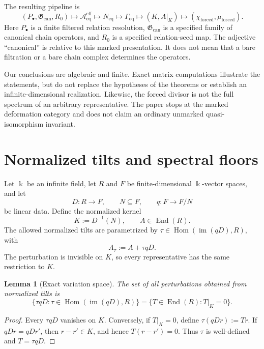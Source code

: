 \documentclass[11pt]{article}
\newtheorem{lemma}[theorem]{Lemma}
\theoremstyle{definition}
\newcommand{\kk}{\Bbbk}
\newcommand{\im}{\operatorname{im}}
\newcommand{\End}{\operatorname{End}}
\newcommand{\Hom}{\operatorname{Hom}}
\newcommand{\Aeff}{\mathscr A_{\mathrm{eq}}^{\mathrm{eff}}}
\newcommand{\Neq}{N_{\mathrm{eq}}}
\newcommand{\Geq}{\Gamma_{\mathrm{eq}}}
\newcommand{\Gcan}{\mathfrak G_{\mathrm{can}}}
\newcommand{\forced}{\mathrm{forced}}
\begin{document}
The resulting pipeline is
\begin{equation}
\boxed{
(P_\bullet,\Gcan,R_0)
\longmapsto \Aeff
\longmapsto \Neq
\longmapsto \Geq
\longmapsto (K,A|_K)
\longmapsto (\chi_{\forced},\mu_{\forced})
}.
\label{eq:pipeline}
\end{equation}
Here \(P_\bullet\) is a finite filtered relation resolution, \(\Gcan\) is a specified family of
canonical chain operators, and \(R_0\) is a specified relation-seed map. The adjective ``canonical''
is relative to this marked presentation. It does not mean that a bare filtration or a bare chain
complex determines the operators.

Our conclusions are algebraic and finite. Exact matrix computations illustrate the statements, but
do not replace the hypotheses of the theorems or establish an infinite-dimensional realization.
Likewise, the forced divisor is not the full spectrum of an arbitrary representative. The paper
stops at the marked deformation category and does not claim an ordinary unmarked
quasi-isomorphism invariant.

\section{Normalized tilts and spectral floors}

Let \(\kk\) be an infinite field, let \(R\) and \(F\) be finite-dimensional \(\kk\)-vector spaces, and let
\[
D:R\longrightarrow F, \qquad N\subseteq F, \qquad q:F\longrightarrow F/N
\]
be linear data. Define the normalized kernel
\begin{equation}
K:=D^{-1}(N),
\qquad A\in\End(R).
\label{eq:K}
\end{equation}
The allowed normalized tilts are parametrized by \(\tau\in\Hom(\im(qD),R)\), with
\begin{equation}
A_\tau:=A+\tau qD.
\label{eq:tilt}
\end{equation}
The perturbation is invisible on \(K\), so every representative has the same restriction to
\(K\).

\begin{lemma}[Exact variation space]
The set of all perturbations obtained from normalized tilts is
\begin{equation}
\{\tau qD:\tau\in\Hom(\im(qD),R)\}
=\{T\in\End(R):T|_K=0\}.
\label{eq:variation}
\end{equation}
\end{lemma}

\begin{proof}
Every \(\tau qD\) vanishes on \(K\). Conversely, if \(T|_K=0\), define \(\tau(qD r):=Tr\).
If \(qDr=qDr'\), then \(r-r'\in K\), and hence \(T(r-r')=0\). Thus \(\tau\) is well-defined
and \(T=\tau qD\).
\end{proof}
\end{document}
